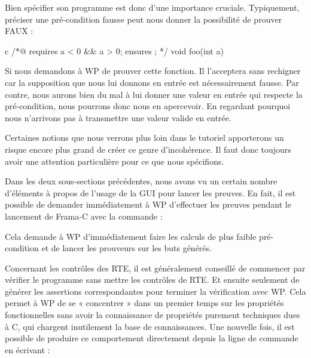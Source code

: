 Bien spécifier son programme est donc d'une importance cruciale. Typiquement, 
préciser une pré-condition fausse peut nous donner la possibilité de prouver 
FAUX :



\begin{CodeBlock}{c}
/*@
  requires a < 0 && a > 0;
  ensures  \false;
*/
void foo(int a){

}
\end{CodeBlock}



Si nous demandons à WP de prouver cette fonction. Il l'acceptera sans rechigner
car la supposition que nous lui donnons en entrée est nécessairement fausse. Par
contre, nous aurons bien du mal à lui donner une valeur en entrée qui respecte la 
pré-condition, nous pourrons donc nous en apercevoir. En regardant pourquoi nous
n'arrivons pas à transmettre une valeur valide en entrée.



Certaines notions que nous verrons plus loin dans le tutoriel apporterons un 
risque encore plus grand de créer ce genre d'incohérence. Il faut donc toujours
avoir une attention particulière pour ce que nous spécifions.








Dans les deux sous-sections précédentes, nous avons vu un certain nombre 
d'éléments à propos de l'usage de la GUI pour lancer les preuves. En fait, 
il est possible de demander immédiatement à WP d'effectuer les preuves pendant
le lancement de Frama-C avec la commande :






Cela demande à WP d'immédiatement faire les calculs de plus faible pré-condition
et de lancer les prouveurs sur les buts générés.



Concernant les contrôles des RTE, il est généralement conseillé de commencer par
vérifier le programme sans mettre les contrôles de RTE. Et ensuite seulement de
générer les assertions correspondantes pour terminer la vérification avec WP. 
Cela permet à WP de se « concentrer » dans un premier temps sur les propriétés 
fonctionnelles sans avoir la connaissance de propriétés purement techniques dues
à C, qui chargent inutilement la base de connaissances. Une nouvelle fois, il est
possible de produire ce comportement directement depuis la ligne de commande en
écrivant :




